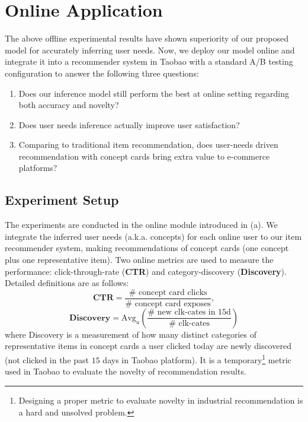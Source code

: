 \section{Online Application}

The above offline experimental results have shown superiority of our proposed model for accurately inferring user needs.
Now, we deploy our model online and integrate it into a recommender system in Taobao with a standard A/B testing configuration to answer the following three questions:
\begin{enumerate}
	\itemsep0em
	\item Does our inference model still perform the best at online setting regarding both accuracy and novelty?
	\item Does user needs inference actually improve user satisfaction?
	\item Comparing to traditional item recommendation, does user-needs driven recommendation with concept cards bring extra value to e-commerce platforms? 
	
\end{enumerate}

\subsection{Experiment Setup}
The experiments are conducted in the online module introduced in  (a).
We integrate the inferred user needs (a.k.a. concepts) for each online user to our item recommender system, 
making recommendations of concept cards (one concept plus one representative item).
Two online metrics are used to measure the performance: 
click-through-rate (\textbf{CTR}) and category-discovery (\textbf{Discovery}). Detailed definitions are as follows:
\begin{equation}
\textbf{CTR} = \frac{\# \text{ concept card clicks}}{\# \text{ concept card exposes}},
\end{equation}
\begin{equation}
\textbf{Discovery} = \text{Avg}_u(\frac{\# \text{ new clk-cates in 15d}} {\# \text{ clk-cates}})
\end{equation}
where Discovery is a measurement of how many distinct categories of representative items in concept cards a user clicked today are newly discovered (not clicked in the past $15$ days in Taobao platform).
It is a temporary\footnote{Designing a proper metric to evaluate novelty in industrial recommendation is a hard and unsolved problem.} metric used in Taobao to evaluate the novelty of recommendation results.

